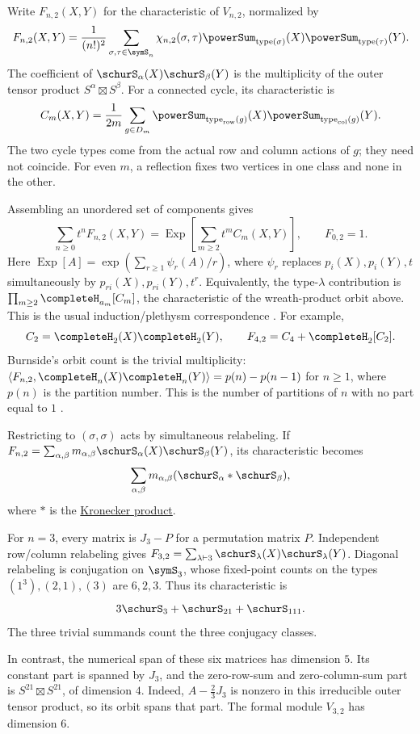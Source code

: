 \begin{example}
\label{regularMatrixTwoAlphabets}
Write $F_{n,2}(X,Y)$ for the characteristic of $V_{n,2}$, normalized by
\[
 F_{n,2}(X,Y)=\frac1{(n!)^2}
 \sum_{\sigma,\tau\in\symS_n}\chi_{n,2}(\sigma,\tau)
 \powerSum_{\operatorname{type}(\sigma)}(X)
 \powerSum_{\operatorname{type}(\tau)}(Y).
\]
The coefficient of $\schurS_\alpha(X)\schurS_\beta(Y)$ is the multiplicity
of the outer tensor product $S^\alpha\boxtimes S^\beta$.
For a connected cycle, its characteristic is
\[
 C_m(X,Y)=\frac1{2m}\sum_{g\in D_m}
 \powerSum_{\operatorname{type}_{\rm row}(g)}(X)
 \powerSum_{\operatorname{type}_{\rm col}(g)}(Y).
\]
The two cycle types come from the actual row and column actions of $g$;
they need not coincide. For even $m$, a reflection fixes two vertices
in one class and none in the other.

Assembling an unordered set of components gives
\[
 \sum_{n\geq0}t^nF_{n,2}(X,Y)
 =\operatorname{Exp}\left[\sum_{m\geq2}t^mC_m(X,Y)\right],
 \qquad F_{0,2}=1.
\]
Here $\operatorname{Exp}[A]=\exp(\sum_{r\geq1}\psi_r(A)/r)$, where
$\psi_r$ replaces $p_i(X),p_i(Y),t$ simultaneously by
$p_{ri}(X),p_{ri}(Y),t^r$. Equivalently, the type-$\lambda$ contribution is
$\prod_{m\geq2}\completeH_{a_m}[C_m]$, the characteristic of the
wreath-product orbit above. This is the usual induction/plethysm
correspondence \cite[Chap.~I, Sec.~8]{Macdonald1995}.
For example,
\[
 C_2=\completeH_2(X)\completeH_2(Y),\qquad
 F_{4,2}=C_4+\completeH_2[C_2].
\]
Burnside's orbit count is the trivial multiplicity:
$\langle F_{n,2},\completeH_n(X)\completeH_n(Y)\rangle=p(n)-p(n-1)$
for $n\geq1$, where $p(n)$ is the partition number. This is the number of
partitions of $n$ with no part equal to $1$ .
\end{example}

\begin{example}
\label{regularMatrixDiagonalAction}
Restricting to $(\sigma,\sigma)$ acts by simultaneous relabeling.
If $F_{n,2}=\sum_{\alpha,\beta}m_{\alpha,\beta}
\schurS_\alpha(X)\schurS_\beta(Y)$, its characteristic becomes
\[
 \sum_{\alpha,\beta}m_{\alpha,\beta}
       (\schurS_\alpha*\schurS_\beta),
\]
where $*$ is the \hyperref[schurKroneckerCoefficients]{Kronecker product}.

For $n=3$, every matrix is $J_3-P$ for a permutation matrix $P$.
Independent row/column relabeling gives
$F_{3,2}=\sum_{\lambda\vdash3}\schurS_\lambda(X)\schurS_\lambda(Y)$.
Diagonal relabeling is conjugation on $\symS_3$, whose fixed-point counts
on the types $(1^3),(2,1),(3)$ are $6,2,3$. Thus its characteristic is
\[
 3\schurS_3+\schurS_{21}+\schurS_{111}.
\]
The three trivial summands count the three conjugacy classes.

In contrast, the numerical span of these six matrices has dimension $5$.
Its constant part is spanned by $J_3$, and the zero-row-sum and
zero-column-sum part is $S^{21}\boxtimes S^{21}$, of dimension $4$.
Indeed, $A-\tfrac23J_3$ is nonzero in this irreducible outer tensor product,
so its orbit spans that part. The formal module $V_{3,2}$ has dimension $6$.
\end{example}


